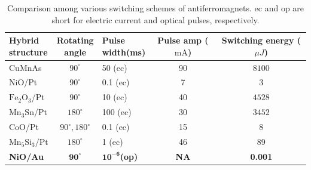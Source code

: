 \documentclass[aps,prl,reprint,floatfix,longbibliography,twocolumn]{revtex4-2}
\begin{document}
\begin{table}[h!]
\centering
\caption{Comparison among various switching schemes of antiferromagnets. ec and op are short for electric current and optical pulses, respectively. }
\begin{tabular}{l|c|l|c|c}
    \hline
    \hline
  \shortstack{Hybrid\\ structure} & \shortstack{Rotating\\ angle}&\shortstack{Pulse \\ width(ms)} &\shortstack{Pulse amp\\ ($\mathrm{mA}$)} &\shortstack{Switching \\ energy ($\mu J$)} \\
  \hline
   CuMnAs \cite{Wadley2016}& $90^\circ$ & 50 (ec) & 90 &$8100$\\
   NiO/Pt \cite{Meernl2021}&$90^\circ$ & 0.1 (ec) & 7 & $3$ \\
  $\mathrm{Fe_2O_3}$/Pt \cite{Zhangprl2019} &$90^\circ$ & 10 (ec)  & 40 & $4528$\\
 $\mathrm{Mn_3Sn}$/Pt \cite{Tsai2020} &$180^\circ$ & 100 (ec) & 30&  $3452$\\
  CoO/Pt \cite{Wuprb2024}& $90^\circ,180^\circ$ &0.1 (ec)& 15 &$8$\\
  $\mathrm{Mn_5Si_3/Pt}$ \cite{HanSA2024} &$180^\circ$& 1 (ec) &46 & 89 \\
  \hline
 \textbf{NiO/Au} &$\mathbf{90^\circ}$&\textbf{$\mathbf{10^{-6}}$(op)}& \textbf{NA} &\textbf{0.001}\\
\hline
\end{tabular}
\label{tab1}
\end{table}
\end{document}
